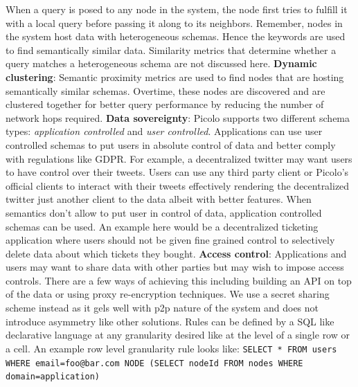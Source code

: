 \documentclass[preprint,12pt]{elsarticle}
\begin{document}
When a query is posed to any node in the system, the node first tries to fulfill it with a local query before passing it along to its neighbors. Remember, nodes in the system host data with heterogeneous schemas. Hence the keywords are used to find semantically similar data. Similarity metrics that determine whether a query matches a heterogeneous schema are not discussed here.
\newline
\newline
\textbf{Dynamic clustering}:
Semantic proximity metrics are used to find nodes that are hosting semantically similar schemas. Overtime, these nodes are discovered and are clustered together for better query performance by reducing the number of network hops required.
\newline
\newline
\textbf{Data sovereignty}: 
Picolo supports two different schema types: \textit{application controlled} and \textit{user controlled}. Applications can use user controlled schemas to put users in absolute control of data and better comply with regulations like GDPR. For example, a decentralized twitter may  want users to have control over their tweets. Users can use any third party client or Picolo's official clients to interact with their tweets effectively rendering the decentralized twitter just another client to the data albeit with better features. \newline\newline
When semantics don't allow to put user in control of data, application controlled schemas can be used. An example here would be a decentralized ticketing application where users should not be given fine grained control to selectively delete data about which tickets they bought.
\newline
\newline
\textbf{Access control}:
Applications and users may want to share data with other parties but may wish to impose access controls. There are a few ways of achieving this including building an API on top of the data or using proxy re-encryption techniques. We use a secret sharing scheme instead as it gels well with p2p nature of the system and does not introduce asymmetry like other solutions. Rules can be defined by a SQL like declarative language at any granularity desired like at the level of a single row or a cell. An example row level granularity rule looks like:\newline \newline
\texttt{SELECT  * \newline FROM users \newline WHERE email=foo@bar.com \newline NODE (SELECT nodeId FROM nodes WHERE domain=application)} \newline \newline
\end{document}
